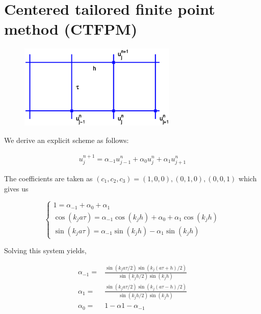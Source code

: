 \section{Centered tailored finite point method (CTFPM)}
\begin{figure}[htbp]
	\centering
		\includegraphics[height=4cm]{Figures/CTFPM_mesh.eps}\\
	\caption[RCTFPM imaginary part]{}
\end{figure}
We derive an explicit scheme as follows:

\begin{align}
u_{j}^{n+1} = \alpha_{-1}u_{j-1}^{n}+\alpha_{0}u_{j}^{n} + \alpha_{1}u_{j+1}^{n} 
\end{align}

The coefficients are taken as $(c_1,c_2,c_3) = (1,0,0),(0,1,0),(0,0,1)$ which gives us

\[ \begin{cases} 
      1 = \alpha_{-1} + \alpha_{0} + \alpha_{1} \\
      \cos(k_{j}a\tau) = \alpha_{-1}\cos(k_{j}h) +\alpha_{0} + \alpha_{1}\cos(k_{j}h)\\
      \sin(k_{j}a\tau) =  \alpha_{-1}\sin(k_{j}h) - \alpha_{1}\sin(k_{j}h)
   \end{cases}
\]

Solving this system yields,

\begin{align*}
 \alpha_{-1} =& \frac{\sin(k_{j}a\tau/2)\sin(k_{j}(a\tau + h)/2)}{\sin(k_{j}h/2)\sin(k_{j}h)}\\
 \alpha_{1} =& \frac{\sin(k_{j}a\tau/2)\sin(k_{j}(a\tau - h)/2)}{\sin(k_{j}h/2)\sin(k_{j}h)}\\
 \alpha_{0} =& 1 - \alpha{1} - \alpha_{-1}
\end{align*}

